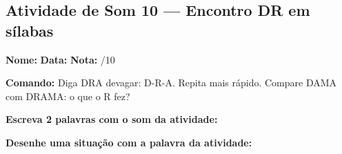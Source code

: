 \subsection{Atividade de Som 10 --- Encontro DR em sílabas}
\begin{exercicio}



\noindent\textbf{Nome:} \underline{\hspace{3.2cm}} \quad \textbf{Data:} \underline{\hspace{1.6cm}} \quad \textbf{Nota:} \underline{\hspace{0.9cm}}/10


\noindent\textbf{Comando:} Diga DRA devagar: D-R-A. Repita mais rápido. Compare DAMA com DRAMA: o que o R fez?


\begin{center}
\end{center}

\noindent\textbf{Escreva 2 palavras com o som da atividade:}

\begin{center}
  \underline{\hspace{3cm}} \quad \underline{\hspace{3cm}}
\end{center}

\noindent\textbf{Desenhe uma situação com a palavra da atividade:}

\begin{center}
\end{center}

\end{exercicio}



